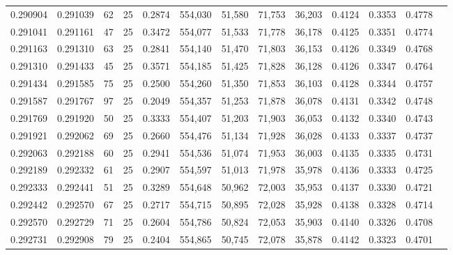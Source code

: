 \begin{tabular}{rrrrrrrrrrrrr}
0.290904 & 0.291039 &    62 &  25 &                                     0.2874 & 554,030 &  51,580 &  71,753 &  36,203 & 0.4124 & 0.3353 & 0.4778 \\
0.291041 & 0.291161 &    47 &  25 &                                     0.3472 & 554,077 &  51,533 &  71,778 &  36,178 & 0.4125 & 0.3351 & 0.4774 \\
0.291163 & 0.291310 &    63 &  25 &                                     0.2841 & 554,140 &  51,470 &  71,803 &  36,153 & 0.4126 & 0.3349 & 0.4768 \\
0.291310 & 0.291433 &    45 &  25 &                                     0.3571 & 554,185 &  51,425 &  71,828 &  36,128 & 0.4126 & 0.3347 & 0.4764 \\
0.291434 & 0.291585 &    75 &  25 &                                     0.2500 & 554,260 &  51,350 &  71,853 &  36,103 & 0.4128 & 0.3344 & 0.4757 \\
0.291587 & 0.291767 &    97 &  25 &                                     0.2049 & 554,357 &  51,253 &  71,878 &  36,078 & 0.4131 & 0.3342 & 0.4748 \\
0.291769 & 0.291920 &    50 &  25 &                                     0.3333 & 554,407 &  51,203 &  71,903 &  36,053 & 0.4132 & 0.3340 & 0.4743 \\
0.291921 & 0.292062 &    69 &  25 &                                     0.2660 & 554,476 &  51,134 &  71,928 &  36,028 & 0.4133 & 0.3337 & 0.4737 \\
0.292063 & 0.292188 &    60 &  25 &                                     0.2941 & 554,536 &  51,074 &  71,953 &  36,003 & 0.4135 & 0.3335 & 0.4731 \\
0.292189 & 0.292332 &    61 &  25 &                                     0.2907 & 554,597 &  51,013 &  71,978 &  35,978 & 0.4136 & 0.3333 & 0.4725 \\
0.292333 & 0.292441 &    51 &  25 &                                     0.3289 & 554,648 &  50,962 &  72,003 &  35,953 & 0.4137 & 0.3330 & 0.4721 \\
0.292442 & 0.292570 &    67 &  25 &                                     0.2717 & 554,715 &  50,895 &  72,028 &  35,928 & 0.4138 & 0.3328 & 0.4714 \\
0.292570 & 0.292729 &    71 &  25 &                                     0.2604 & 554,786 &  50,824 &  72,053 &  35,903 & 0.4140 & 0.3326 & 0.4708 \\
0.292731 & 0.292908 &    79 &  25 &                                     0.2404 & 554,865 &  50,745 &  72,078 &  35,878 & 0.4142 & 0.3323 & 0.4701 \\

\end{tabular}

